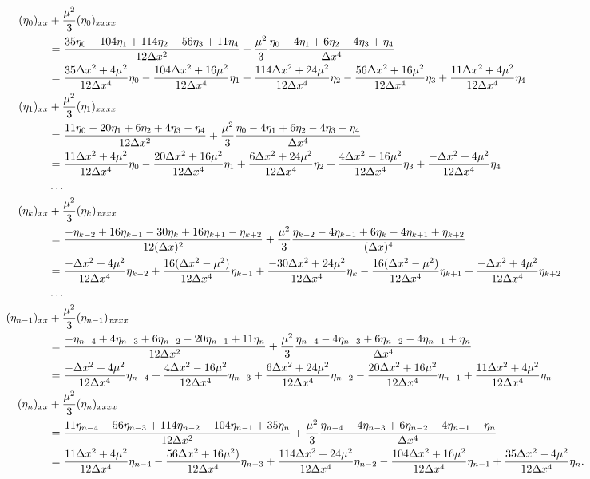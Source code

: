 \documentclass[10pt,reqno,oneside,a4paper, landscape]{article}
\begin{document}
\begin{align*}
(\eta_0)_{xx} &+ \frac{\mu^2}{3} (\eta_0)_{xxxx}  \\
&= \frac{35\eta_0 -104 \eta_{1} +114 \eta_2 -56\eta_3 + 11\eta_4}{12\Delta x^2} + \frac{\mu^2}{3} \frac{\eta_0 -4 \eta_{1} +6 \eta_2 -4\eta_3 + \eta_4}{\Delta x^4} \\
&= \frac{35\Delta x^2 + 4 \mu^2}{12\Delta x^4} \eta_0 - \frac{104 \Delta x^2 + 16\mu^2}{12\Delta x^4} \eta_1 + \frac{114 \Delta x^2 + 24 \mu^2}{12\Delta x^4} \eta_2 - \frac{56 \Delta x^2 + 16\mu^2}{12\Delta x^4} \eta_3 + \frac{11 \Delta x^2 + 4\mu^2}{12\Delta x^4} \eta_4 \\
(\eta_1)_{xx} &+ \frac{\mu^2}{3} (\eta_1)_{xxxx} \\
&= \frac{11\eta_0 -20 \eta_{1} +6 \eta_2 + 4\eta_3 - \eta_4}{12\Delta x^2} +\frac{\mu^2}{3} \frac{\eta_0 -4 \eta_{1} +6 \eta_2 -4\eta_3 + \eta_4}{\Delta x^4} \\
&= \frac{11\Delta x^2 + 4 \mu^2}{12\Delta x^4} \eta_0 - \frac{20 \Delta x^2 + 16\mu^2}{12\Delta x^4} \eta_1 + \frac{6 \Delta x^2 + 24 \mu^2}{12\Delta x^4} \eta_2 + \frac{4 \Delta x^2 - 16\mu^2}{12\Delta x^4} \eta_3 + \frac{- \Delta x^2 + 4\mu^2}{12\Delta x^4} \eta_4 \\
&\ldots \\
(\eta_k)_{xx} &+ \frac{\mu^2}{3} (\eta_k)_{xxxx} \\
&= \frac{-\eta_{k-2} +16 \eta_{k-1} - 30\eta_k+16\eta_{k+1} - \eta_{k+2}}{12(\Delta x)^2} + 
\frac{\mu^2}{3} \frac{\eta_{k-2} -4 \eta_{k-1} + 6\eta_k - 4\eta_{k+1} + \eta_{k+2}}{(\Delta x)^4}\\
&=\frac{-\Delta x^2 + 4 \mu^2}{12\Delta x^4} \eta_{k-2} + \frac{16 (\Delta x^2 -\mu^2)}{12\Delta x^4} \eta_{k-1} + \frac{-30\Delta x^2 + 24 \mu^2}{12\Delta x^4} \eta_k - \frac{16(\Delta x^2 - \mu^2)}{12\Delta x^4} \eta_{k+1} + \frac{- \Delta x^2 + 4\mu^2}{12\Delta x^4} \eta_{k+2} \\
&\ldots \\
(\eta_{n-1})_{xx} &+ \frac{\mu^2}{3} (\eta_{n-1})_{xxxx} \\
&= \frac{-\eta_{n-4} + 4 \eta_{n-3} + 6 \eta_{n-2} -20 \eta_{n-1} + 11\eta_n}{12\Delta x^2}  + \frac{\mu^2}{3} \frac{\eta_{n-4} -4 \eta_{n-3} +6 \eta_{n-2} -4 \eta_{n-1} + \eta_n}{\Delta x^4} \\
&= \frac{-\Delta x^2 + 4 \mu^2}{12\Delta x^4} \eta_{n-4} + \frac{4 \Delta x^2 -16\mu^2}{12\Delta x^4} \eta_{n-3} + \frac{6\Delta x^2 + 24 \mu^2}{12\Delta x^4} \eta_{n-2} - \frac{20\Delta x^2 +16 \mu^2}{12\Delta x^4} \eta_{n-1} + \frac{11 \Delta x^2 + 4\mu^2}{12\Delta x^4} \eta_n \\
(\eta_{n})_{xx} &+ \frac{\mu^2}{3} (\eta_{n})_{xxxx} \\
&= 
\frac{11\eta_{n-4} -56 \eta_{n-3} + 114 \eta_{n-2} -104 \eta_{n-1} + 35\eta_n}{12\Delta x^2} + \frac{\mu^2}{3}\frac{\eta_{n-4} -4 \eta_{n-3} +6 \eta_{n-2} -4 \eta_{n-1} + \eta_n}{\Delta x^4} \\
&= \frac{11\Delta x^2 + 4 \mu^2}{12\Delta x^4} \eta_{n-4} - \frac{56 \Delta x^2 +16\mu^2)}{12\Delta x^4} \eta_{n-3} + \frac{114\Delta x^2 + 24 \mu^2}{12\Delta x^4} \eta_{n-2} - \frac{104\Delta x^2 +16 \mu^2}{12\Delta x^4} \eta_{n-1} + \frac{35 \Delta x^2 + 4\mu^2}{12\Delta x^4} \eta_n.
\end{align*}
\end{document}
